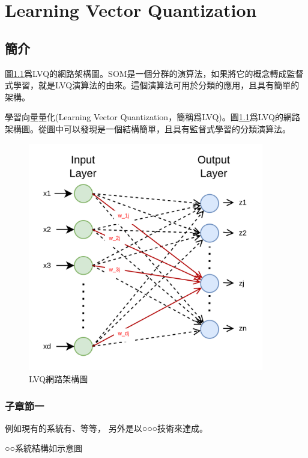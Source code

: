 \chapter{Learning Vector Quantization}
\label{chapter:intro}
\section{簡介}

	圖\ref{fig:lvq_network}爲LVQ的網路架構圖。SOM是一個分群的演算法，如果將它的概念轉成監督式學習，就是LVQ演算法的由來。這個演算法可用於分類的應用，且具有簡單的架構。

	學習向量量化(Learning Vector Quantization，簡稱爲LVQ)。圖\ref{fig:lvq_network}爲LVQ的網路架構圖。從圖中可以發現是一個結構簡單，且具有監督式學習的分類演算法。

	\begin{figure}[h]
			\centering
			\includegraphics[height=10cm]{./pic/zMBsAkkS.png}
			\caption{LVQ網路架構圖}
			\label{fig:lvq_network}
		\end{figure}

\label{sec:background}
    \subsection{子章節一}

        例如現有的系統有\cite{GoogleComputeEngine}、\cite{AmazonEC2}等等，
        另外\cite{GoogleApps}是以○○○技術來達成。

        ○○系統結構如示意圖


